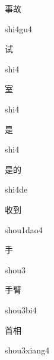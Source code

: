 \begin{verbete}[shi4gu4]{事故}
\begin{pronuncia}{shi4gu4}
\end{pronuncia}
\end{verbete}

\begin{verbete}[shi4]{试}
\begin{pronuncia}{shi4}
\end{pronuncia}
\end{verbete}

\begin{verbete}[shi4]{室}
\begin{pronuncia}{shi4}
\end{pronuncia}
\end{verbete}

\begin{verbete}[shi4]{是}
\begin{pronuncia}{shi4}
\end{pronuncia}
\end{verbete}

\begin{verbete}[shi4de]{是的}
\begin{pronuncia}{shi4de}
\end{pronuncia}
\end{verbete}

\begin{verbete}{收到}
\begin{pronuncia}{shou1dao4}
\end{pronuncia}
\end{verbete}

\begin{verbete}[shou3]{手}
\begin{pronuncia}{shou3}
\end{pronuncia}
\end{verbete}

\begin{verbete}[shou3bi4]{手臂}
\begin{pronuncia}{shou3bi4}
\end{pronuncia}
\end{verbete}

\begin{verbete}{首相}
\begin{pronuncia}{shou3xiang4}
\end{pronuncia}
\end{verbete}

